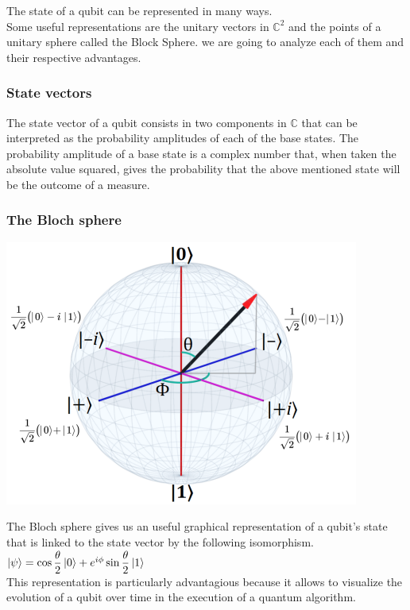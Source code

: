 \documentclass{article}
\begin{document}
The state of a qubit can be represented in many ways.\\
Some useful representations are the unitary vectors in $\mathbb{C}^2$
and the points of a unitary sphere called the Block Sphere.
we are going to analyze each of them and their respective advantages.

\subsubsection{State vectors}

The state vector of a qubit consists in two components in $\mathbb{C}$
that can be interpreted as the probability amplitudes of each of the
base states.
The probability amplitude of a base state is a complex number that,
when taken the absolute value squared, gives the probability that the
above mentioned state will be the outcome
of a measure. %


\subsubsection{The Bloch sphere}

\begin{center}
	\includegraphics[scale=0.5]{bloch-sphere.png}
\end{center}
The Bloch sphere gives us an useful graphical representation of a
qubit's state that is linked to the state vector by the following
isomorphism.\\

$\ket{\psi} = \cos{\dfrac{\theta}{2}}\ket{0}+e^{i\phi}\sin{\dfrac{\theta}{2}}\ket{1}$ \\

\vspace{10pt}
This representation is particularly advantagious because it allows
to visualize the evolution of a qubit over time in the execution
of a quantum algorithm.
\end{document}
